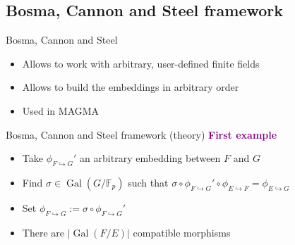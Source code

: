 \documentclass[xcolor=x11names,compress]{beamer}
\theoremstyle{break}
\theoremstyle{sc}
\theoremstyle{definition}
\theoremstyle{remark}
\DeclareMathOperator{\Gal}{Gal}
\newcommand{\embed}[2]{\phi_{#1\hookrightarrow#2}}
\begin{document}
\subsection{Bosma, Cannon and Steel framework}
\begin{frame}{Bosma, Cannon and Steel}
  \begin{itemize}
    \item Allows to work with arbitrary, user-defined finite fields
    \item Allows to build the embeddings in arbitrary order
    \item Used in MAGMA
  \end{itemize}
\end{frame}
\begin{frame}{Bosma, Cannon and Steel framework (theory)}
  \textcolor{purple}{\textbf{First example}} 
  \begin{figure}
    \centering
  \end{figure}
  \begin{itemize}
    \item Take $\embed{F}{G}'$ an arbitrary embedding between $F$ and
      $G$
    \item Find $\sigma\in\Gal(G/\mathbb{F}_p)$ such that
      $\sigma\circ\embed{F}{G}'\circ\embed{E}{F}=\embed{E}{G}$
    \item Set $\embed{F}{G}:=\sigma\circ\embed{F}{G}'$
    \item There are $|\Gal(F/E)|$ compatible morphisms
  \end{itemize}
\end{frame}
\end{document}
